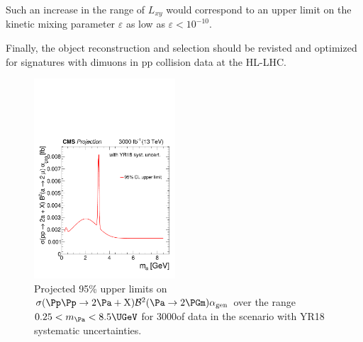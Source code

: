 Such an increase in the range of $L_{xy}$ would correspond to an upper limit on the kinetic mixing parameter $\varepsilon$ as low as $\varepsilon<10^{-10}$.

Finally, the object reconstruction and selection should be revisted and optimized for signatures with dimuons in pp collision data at the HL-LHC.

\begin{figure}
\centering
\includegraphics[width=0.47\textwidth]{plots/nmssm_plots_scenario_2/limit_CSxBR2xAlpha_fb_vs_mGammaD_3000.pdf}
\caption{Projected 95\% \CL upper limits on ${\sigma(\Pp\Pp \to 2 \Pa + \PX)  \mathcal{B}^2 (\Pa \to 2\PGm)  \alphaGen}$ over the range ${0.25 < \MPa < 8.5\UGeV}$ for 3000\fbinv of data in the scenario with YR18 systematic uncertainties.}
\label{fig:my_label1}
\end{figure}

